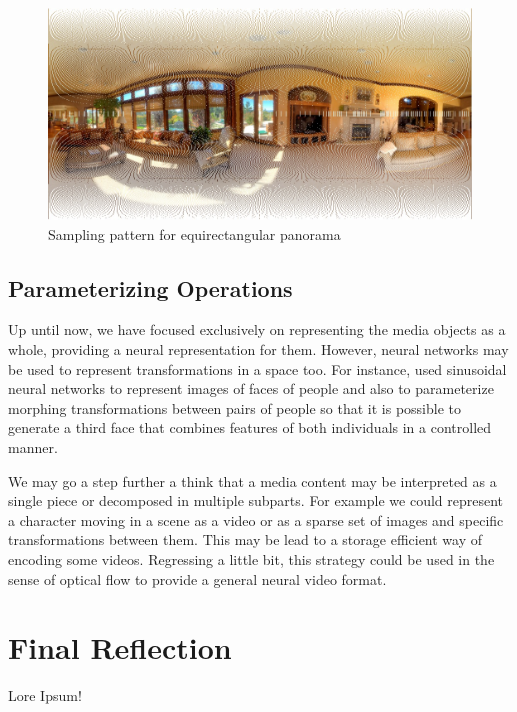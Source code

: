 \begin{figure}[!ht]
   \centering
   \includegraphics[width=0.80\linewidth]{img/ch7/sampling-pattern.jpeg}
   \caption{Sampling pattern for equirectangular panorama} 
   \label{f:inr-panorama}
\end{figure}


\subsection{Parameterizing Operations}

Up until now, we have focused exclusively on representing the media objects as a whole, providing a neural representation for them. However, neural networks may be used to represent transformations in a space too. For instance, \cite{schardong2024neural} used sinusoidal neural networks to represent images of faces of people and also to parameterize morphing transformations between pairs of people so that it is possible to generate a third face that combines features of both individuals in a controlled manner.


We may go a step further a think that a media content may be interpreted as a single piece or decomposed in multiple subparts. For example we could represent a character moving in a scene as a video or as a sparse set of images and specific transformations between them. This may be lead to a storage efficient way of encoding some videos. Regressing a little bit, this strategy could be used in the sense of optical flow \citep{alfarano-opticalflow} to provide a general neural video format.


\section{Final Reflection}

Lore Ipsum!

